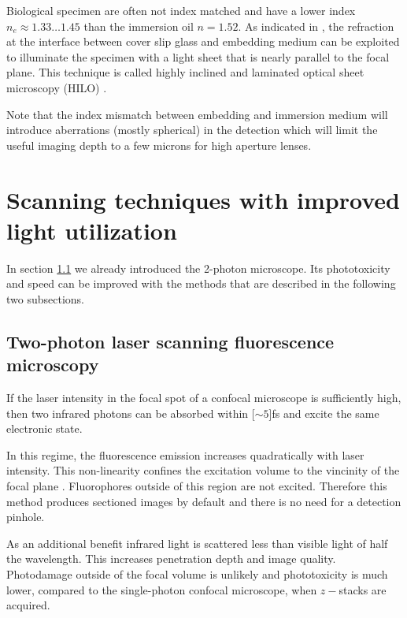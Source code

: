 
Biological specimen are often not index matched and have a lower index
$n_e\approx 1.33\ldots1.45$ than the immersion oil $n=1.52$. As
indicated in , the refraction at the interface
between cover slip glass and embedding medium can be exploited to
illuminate the specimen with a light sheet that is nearly parallel to
the focal plane.  This technique is called highly inclined and
laminated optical sheet microscopy (HILO) \citep{Tokunaga2008,
  Konopka2008}.


Note that the index mismatch between embedding and immersion medium
will introduce aberrations (mostly spherical) in the detection which
will limit the useful imaging depth to a few microns for high aperture
lenses.
\section{Scanning techniques with improved light utilization}
\begin{summary}
  In section \ref{sec:2-photon} we already introduced the 2-photon
  microscope. Its phototoxicity and speed can be improved with the
  methods that are described in the following two subsections.
\end{summary}
\subsection{Two-photon laser scanning fluorescence microscopy}
\label{sec:2-photon}
If the laser intensity in the focal spot of a confocal microscope is
sufficiently high, then two infrared photons can be absorbed within
\unit[$\sim 5$]{fs} and excite the same electronic state.

In this regime, the fluorescence emission increases quadratically with
laser intensity. This non-linearity confines the excitation volume to
the vincinity of the focal plane \citep{Denk1990}. Fluorophores
outside of this region are not excited. Therefore this method produces
sectioned images by default and there is no need for a detection
pinhole.

As an additional benefit infrared light is scattered less than visible
light of half the wavelength. This increases penetration depth and
image quality. Photodamage outside of the focal volume is unlikely and
phototoxicity is much lower, compared to the single-photon confocal
microscope, when $z-$stacks are acquired.

